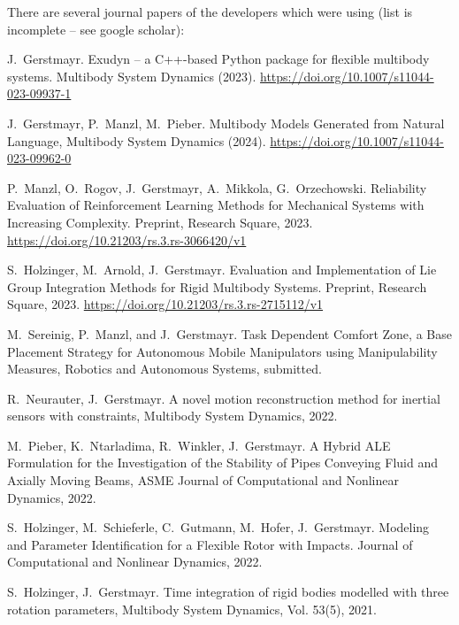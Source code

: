 There are several journal papers of the developers which were using \codeName (list is incomplete -- see google scholar):
\bi
  \item J.\ Gerstmayr. Exudyn -- a C++-based Python package for flexible multibody systems. Multibody System Dynamics (2023). \url{https://doi.org/10.1007/s11044-023-09937-1} 
  \item J.\ Gerstmayr, P.\ Manzl, M.\ Pieber. Multibody Models Generated from Natural Language, Multibody System Dynamics (2024). \url{https://doi.org/10.1007/s11044-023-09962-0} 
  \item P.\ Manzl, O.\ Rogov, J.\ Gerstmayr, A.\ Mikkola, G.\ Orzechowski. Reliability Evaluation of Reinforcement Learning Methods for Mechanical Systems with Increasing Complexity.  Preprint, Research Square, 2023.  \url{https://doi.org/10.21203/rs.3.rs-3066420/v1}
  \item S.\ Holzinger, M.\ Arnold, J.\ Gerstmayr. Evaluation and Implementation of Lie Group Integration Methods for Rigid Multibody Systems. Preprint, Research Square, 2023.  \url{https://doi.org/10.21203/rs.3.rs-2715112/v1} 
  \item M.\ Sereinig, P.\ Manzl, and J.\ Gerstmayr. Task Dependent Comfort Zone, a Base Placement Strategy for Autonomous Mobile Manipulators using Manipulability Measures, Robotics and Autonomous Systems, submitted. \cite{Sereinig2023comfortZone}
  \item R.\ Neurauter, J.\ Gerstmayr. A novel motion reconstruction method for inertial sensors with constraints, Multibody System Dynamics, 2022. \cite{NeurauterGerstmayr2023}
  \item M.\ Pieber, K.\ Ntarladima, R.\ Winkler, J.\ Gerstmayr. A Hybrid ALE Formulation for the Investigation of the Stability of Pipes Conveying Fluid and Axially Moving Beams, ASME Journal of Computational and Nonlinear Dynamics, 2022. 
  \item S.\ Holzinger, M.\ Schieferle, C.\ Gutmann, M.\ Hofer, J.\ Gerstmayr. Modeling and Parameter Identification for a Flexible Rotor with Impacts. Journal of Computational and Nonlinear Dynamics, 2022. 
  \item S.\ Holzinger, J.\ Gerstmayr. Time integration of rigid bodies modelled with three rotation parameters, Multibody System Dynamics, Vol. 53(5), 2021. 
